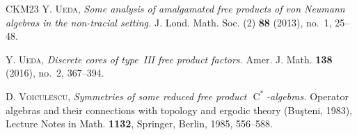 \documentclass[11pt]{amsart}
\numberwithin{equation}{section}
\newcommand{\Cstar}{\operatorname{C}^*}
\theoremstyle{definition}
\begin{document}
\begin{thebibliography}{CKM23}
     \textsc{Y. Ueda}, \textit{Some analysis of amalgamated free products of von Neumann algebras in the non-tracial setting.} J. Lond. Math. Soc. (2) \textbf{88} (2013), no.~1, 25--48.

     \textsc{Y. Ueda}, \textit{Discrete cores of type~\textup{III} free product factors.} Amer. J. Math. \textbf{138} (2016), no.~2, 367--394.

     \textsc{D. Voiculescu}, \textit{Symmetries of some reduced free product $\Cstar$-algebras.} Operator algebras and their connections with topology and ergodic theory (Bu\c{s}teni, 1983), Lecture Notes in Math. \textbf{1132}, Springer, Berlin, 1985, 556--588.

    \enlargethispage{4\baselineskip}
\end{thebibliography}
\end{document}
